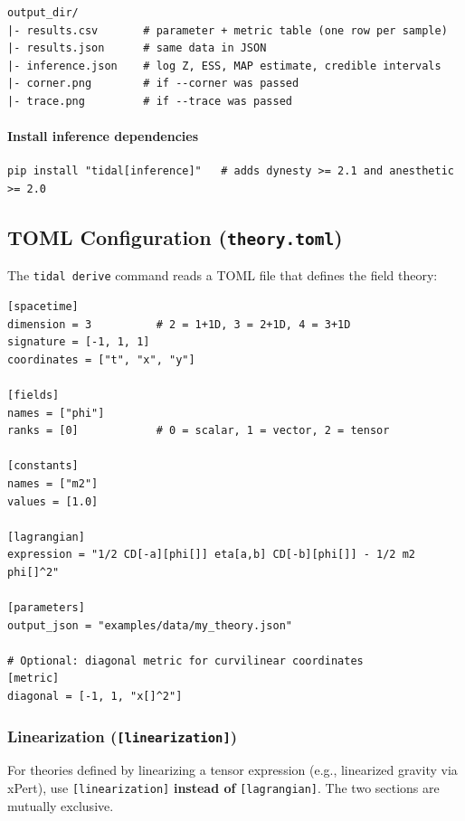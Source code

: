 \begin{lstlisting}
output_dir/
|- results.csv       # parameter + metric table (one row per sample)
|- results.json      # same data in JSON
|- inference.json    # log Z, ESS, MAP estimate, credible intervals
|- corner.png        # if --corner was passed
|- trace.png         # if --trace was passed
\end{lstlisting}

\paragraph{Install inference dependencies}

\begin{lstlisting}[style=bash]
pip install "tidal[inference]"   # adds dynesty >= 2.1 and anesthetic >= 2.0
\end{lstlisting}

\subsection{TOML Configuration (\texttt{theory.toml})}

The \texttt{tidal derive} command reads a TOML file that defines the field theory:

\begin{lstlisting}[style=toml]
[spacetime]
dimension = 3          # 2 = 1+1D, 3 = 2+1D, 4 = 3+1D
signature = [-1, 1, 1]
coordinates = ["t", "x", "y"]

[fields]
names = ["phi"]
ranks = [0]            # 0 = scalar, 1 = vector, 2 = tensor

[constants]
names = ["m2"]
values = [1.0]

[lagrangian]
expression = "1/2 CD[-a][phi[]] eta[a,b] CD[-b][phi[]] - 1/2 m2 phi[]^2"

[parameters]
output_json = "examples/data/my_theory.json"

# Optional: diagonal metric for curvilinear coordinates
[metric]
diagonal = [-1, 1, "x[]^2"]
\end{lstlisting}

\subsubsection{Linearization (\texttt{[linearization]})}

For theories defined by linearizing a tensor expression (e.g., linearized gravity via xPert), use \texttt{[linearization]} \textbf{instead of} \texttt{[lagrangian]}. The two sections are mutually exclusive.

